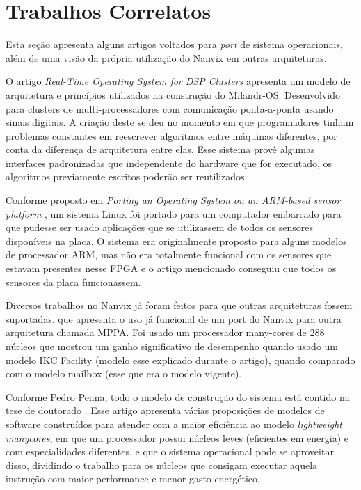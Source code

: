 \section{Trabalhos Correlatos}

Esta seção apresenta alguns artigos voltados para \textit{port} de sistema operacionais, além de uma visão da própria utilização do Nanvix em outras arquiteturas.

O artigo \emph{Real-Time Operating System for DSP Clusters} \cite{Drozdov2015RealTimeOS} apresenta um modelo de arquitetura e princípios utilizados na construção
do Milandr-OS. Desenvolvido para clusters de multi-processadores com comunicação ponta-a-ponta usando sinais digitais. A criação deste se deu no momento em
que programadores tinham problemas constantes em reescrever algoritmos entre máquinas diferentes, por conta da diferença de arquitetura entre elas. Esse sistema
provê algumas interfaces padronizadas que independente do hardware que for executado, os algoritmos previamente escritos poderão ser reutilizados.

Conforme proposto em \emph{Porting an Operating System on an ARM-based sensor platform} \cite{7372829}, um sistema Linux foi portado para um computador embarcado para
que pudesse ser usado aplicações que se utilizassem de todos os sensores disponíveis na placa. O sistema era originalmente proposto para alguns modelos de processador ARM, mas não era totalmente funcional com os sensores que estavam presentes nesse FPGA e o artigo mencionado conseguiu que todos os sensores da placa funcionassem.

Diversos trabalhos no Nanvix já foram feitos para que outras arquiteturas fossem suportadas. \cite{PENNA20211} que apresenta o uso já funcional de um port do 
Nanvix para outra arquitetura chamada MPPA. Foi usado um processador many-cores de 288 núcleos que mostrou um ganho significativo de desempenho quando usado um 
modelo IKC Facility (modelo esse explicado durante o artigo), quando comparado com o modelo mailbox (esse que era o modelo vigente).

Conforme Pedro Penna, todo o modelo de construção do sistema está contido na tese de doutorado \cite{penna:tel-03545212}. Esse artigo apresenta várias proposições 
de modelos de software construídos para atender com a maior eficiência ao modelo \textit{lightweight manycores}, em que um processador possui núcleos leves (eficientes em energia) e com especialidades diferentes, e que o sistema operacional pode se aproveitar disso, dividindo o trabalho para os núcleos que consigam executar aquela instrução com maior performance e menor gasto energético.

